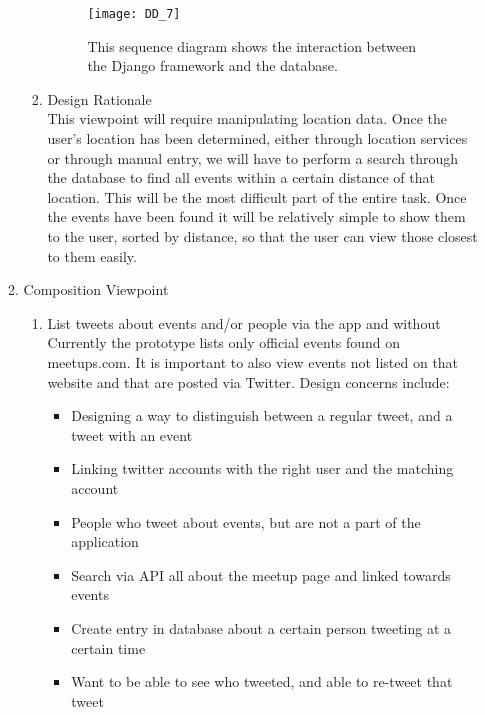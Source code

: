 \documentclass[draftclsnofoot,10pt,onecolumn]{IEEEtran} %
\begin{document}
\begin{enumerate}
\begin{enumerate}
\begin{enumerate}
				\begin{figure}[H]
  					\begin{center}
						\texttt{[image: DD\_7]}
						\captionsetup{width=.4\linewidth}
						\centering
  						\caption{This sequence diagram shows the interaction between the Django framework and the database.}
  					\end{center}
				\end{figure}
					
				\item Design Rationale \\
				This viewpoint will require manipulating location data. Once the user's location has been determined, either
				through location services or through manual entry, we will have to perform a search through the database to
				find all events within a certain distance of that location. This will be the most difficult part of the entire
				task. Once the events have been found it will be relatively simple to show them to the user, sorted by
				distance, so that the user can view those closest to them easily. \\
			\end{enumerate}
			
		\item Composition Viewpoint \\
			\begin{enumerate}
				\item List tweets about events and/or people via the app and without \\
				Currently the prototype lists only official events found on meetups.com. It is important to also view events
				not listed on that website and that are posted via Twitter. Design concerns include:
				\begin{itemize}
					\item Designing a way to distinguish between a regular tweet, and a tweet with an event
					\item Linking twitter accounts with the right user and the matching account
					\item People who tweet about events, but are not a part of the application
					\item Search via API all about the meetup page and linked towards events
					\item Create entry in database about a certain person tweeting at a certain time
					\item Want to be able to see who tweeted, and able to re-tweet that tweet \\
				\end{itemize}
				

\end{enumerate}
\end{enumerate}
\end{enumerate}
\end{document}
